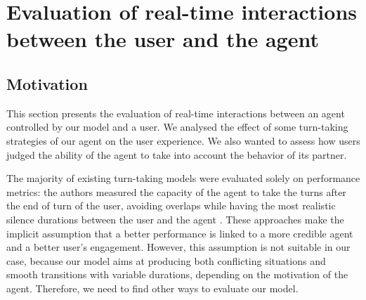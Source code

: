 \section{Evaluation of real-time interactions between the user and the agent}
\label{sec:eval}

\subsection{Motivation}

This section presents the evaluation of real-time interactions between an agent controlled by our model and a user. We analysed the effect of some turn-taking strategies of our agent on the user experience.
We also wanted to assess how users judged the ability of the agent to take into account the behavior of its partner.

The majority of existing turn-taking models were evaluated solely on performance metrics: the authors measured the capacity of the agent to take the turns after the end of turn of the user, avoiding overlaps while having the most realistic silence durations between the user and the agent \cite{jonsdottir_distributed_2013}. These approaches make the implicit assumption that a better performance is linked to a more credible agent and a better user's engagement. 
However, this assumption is not suitable in our case, because our model aims at producing both conflicting situations and smooth transitions with variable durations, depending on the motivation of the agent. Therefore, we need to find other ways to evaluate our model. 

